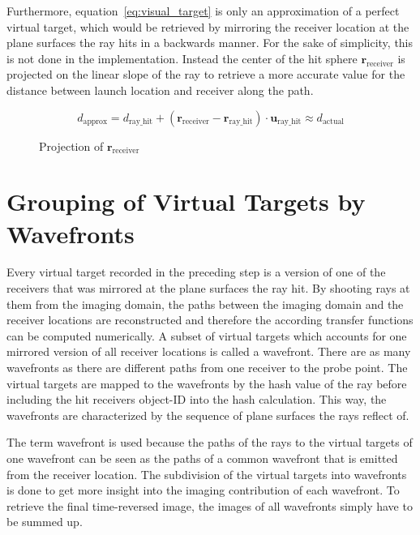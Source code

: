 Furthermore, equation~\eqref{eq:visual_target} is only an approximation of a perfect virtual target, which would be retrieved by mirroring the receiver location at the plane surfaces the ray hits in a backwards manner.
For the sake of simplicity, this is not done in the implementation.
Instead the center of the hit sphere \(\bm{r}_{\text{receiver}}\) is projected on the linear slope of the ray to retrieve a more accurate value for the distance between launch location and receiver along the path.

\begin{equation}
    d_{\text{approx}} = d_{\text{ray\_hit}} +  (\bm{r}_{\text{receiver}} - \bm{r}_{\text{ray\_hit}}) \cdot \bm{u}_{\text{ray\_hit}} \approx d_{\text{actual}}
\end{equation}

\begin{figure}[h]
    \centering
    \def\svgwidth{0.5\textwidth}
    
    \caption{Projection of \(\bm{r}_{\text{receiver}}\)}\label{fig:d_approx}
\end{figure}
 

\section{Grouping of Virtual Targets by Wavefronts}\label{section:subdivision_into_wavefronts}
Every virtual target recorded in the preceding step is a version of one of the receivers that was mirrored at the plane surfaces the ray hit.
By shooting rays at them from the imaging domain, the paths between the imaging domain and the receiver locations are reconstructed and therefore the according transfer functions can be computed numerically.
A subset of virtual targets which accounts for one mirrored version of all receiver locations is called a wavefront.
There are as many wavefronts as there are different paths from one receiver to the probe point.
The virtual targets are mapped to the wavefronts by the hash value of the ray before including the hit receivers object-ID into the hash calculation.
This way, the wavefronts are characterized by the sequence of plane surfaces the rays reflect of.

The term wavefront is used because the paths of the rays to the virtual targets of one wavefront can be seen as the paths of a common wavefront that is emitted from the receiver location.
The subdivision of the virtual targets into wavefronts is done to get more insight into the imaging contribution of each wavefront.
To retrieve the final time-reversed image, the images of all wavefronts simply have to be summed up.


